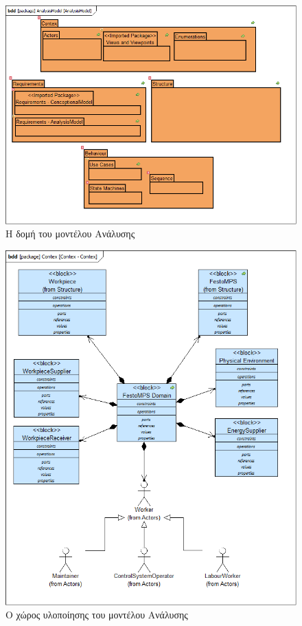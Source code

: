 \documentclass[a4paper,12pt,twoside]{report}
\begin{document}
{\begin{appendices}
			\clearpage
				\begin{figure}[hp]
					\centering
					\includegraphics[scale=0.45]{AnalysisModel_AnalysisModel.png}
					\caption{Η δομή του μοντέλου Ανάλυσης}
					\label{φωτ:Η δομή του μοντέλου Ανάλυσης}
				\end{figure}
				
				\begin{figure}[hp]
					\centering
					\includegraphics[scale=0.45]{AnalysisModel_Contex-Contex.png}
					\caption{Ο χώρος υλοποίησης του μοντέλου Ανάλυσης}
					\label{φωτ:Ο χώρος υλοποίησης του μοντέλου Ανάλυσης}
				\end{figure}
				

\end{appendices}}
\end{document}
